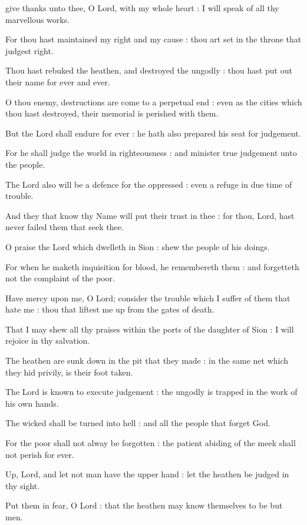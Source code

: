  give thanks unto thee, O Lord, with my whole heart : I will speak of all thy marvellous works.\par
{}
For thou hast maintained my right and my cause : thou art set in the throne that judgest right.\par
{}Thou hast rebuked the heathen, and destroyed the ungodly : thou hast put out their name for ever and ever.\par
{}O thou enemy, destructions are come to a perpetual end : even as the cities which thou hast destroyed, their memorial is perished with them.\par
{}But the Lord shall endure for ever : he hath also prepared his seat for judgement.\par
{}For he shall judge the world in righteousness : and minister true judgement unto the people.\par
{}The Lord also will be a defence for the oppressed : even a refuge in due time of trouble.\par
{}And they that know thy Name will put their trust in thee : for thou, Lord, hast never failed them that seek thee.\par
{}O praise the Lord which dwelleth in Sion : shew the people of his doings.\par
{}For when he maketh inquisition for blood, he remembereth them : and forgetteth not the complaint of the poor.\par
{}Have mercy upon me, O Lord; consider the trouble which I suffer of them that hate me : thou that liftest me up from the gates of death.\par
{}That I may shew all thy praises within the ports of the daughter of Sion : I will rejoice in thy salvation.\par
{}The heathen are sunk down in the pit that they made : in the same net which they hid privily, is their foot taken.\par
{}The Lord is known to execute judgement : the ungodly is trapped in the work of his own hands.\par
{}The wicked shall be turned into hell : and all the people that forget God.\par
{}For the poor shall not alway be forgotten : the patient abiding of the meek shall not perish for ever.\par
{}Up, Lord, and let not man have the upper hand : let the heathen be judged in thy sight.\par
{}Put them in fear, O Lord : that the heathen may know themselves to be but men.\par

